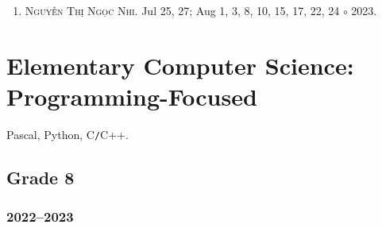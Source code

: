 \documentclass{article}
\begin{document}
\begin{enumerate}
	\item \textsc{Nguyễn Thị Ngọc Nhi.} {\sf[In]} Jul 25, 27; Aug 1, 3, 8, 10, 15, 17, 22, 24 $\circ$ 2023.
\end{enumerate}


\section{Elementary Computer Science: Programming-Focused}
Pascal, Python, C\texttt{/}C++.

\subsection{Grade 8}

\subsubsection{2022--2023}
\end{document}
